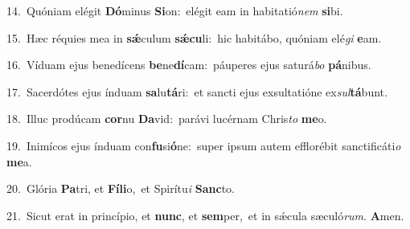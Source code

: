 {\numbfont\textcolor{\numbcolor}{14.}}~Quóniam elégit \textbf{Dó}\-minus \textbf{Si}\-on:~\star elégit eam in habitatió\textit{nem} \textbf{si}\-bi.\par
{\numbfont\textcolor{\numbcolor}{15.}}~Hæc réquies mea in \textbf{sǽ}\-culum \textbf{sǽ}\-\textbf{cu}li:~\star hic habitábo, quóniam elé\textit{gi} \textbf{e}\-am.\par
{\numbfont\textcolor{\numbcolor}{16.}}~Víduam ejus benedícens \textbf{be}\-ne\-\textbf{dí}\-cam:~\star páuperes ejus saturá\textit{bo} \textbf{pá}\-nibus.\par
{\numbfont\textcolor{\numbcolor}{17.}}~Sacerdótes ejus índuam \textbf{sa}\-lu\-\textbf{tá}\-ri:~\star et sancti ejus exsultatióne ex\-\textit{sul}\-\textbf{tá}bunt.\par
{\numbfont\textcolor{\numbcolor}{18.}}~Illuc prodúcam \textbf{cor}\-nu \textbf{Da}\-vid:~\star parávi lucérnam Chris\textit{to} \textbf{me}\-o.\par
{\numbfont\textcolor{\numbcolor}{19.}}~Inimícos ejus índuam con\-\textbf{fu}\-si\-\textbf{ó}\-ne:~\star super ipsum autem efflorébit sanctificáti\textit{o} \textbf{me}\-a.\par
{\numbfont\textcolor{\numbcolor}{20.}}~Glória \textbf{Pa}\-tri, et \textbf{Fí}\-\textbf{li}o,~\star et Spirítu\textit{i} \textbf{Sanc}\-to.\par
{\numbfont\textcolor{\numbcolor}{21.}}~Sicut erat in princípio, et \textbf{nunc}\-, et \textbf{sem}\-per,~\star et in sǽcula sæculó\-\textit{rum}\-. \textbf{A}\-men.\par
